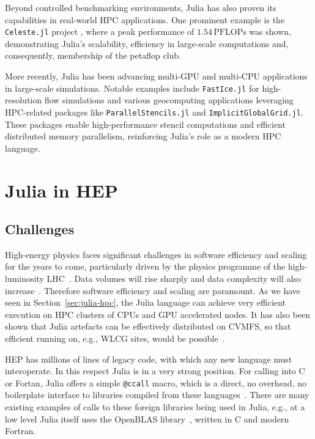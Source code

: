 \documentclass{webofc}
\begin{document}
Beyond controlled benchmarking environments, Julia has also proven its capabilities in real-world HPC applications. One prominent example is the \texttt{Celeste.jl} project \cite{RiegerIEEE:2018,RiegerAAS:2019}, where a peak performance of \(1.54\,\mathrm{PFLOPs}\) was shown, demonstrating Julia's scalability, efficiency in large-scale computations and, consequently, membership of the petaflop club.

More recently, Julia has been advancing multi-GPU and multi-CPU applications in large-scale simulations. Notable examples include \texttt{FastIce.jl}\cite{fasticejl-github} for high-resolution flow simulations and various geocomputing applications leveraging HPC-related packages like \texttt{ParallelStencils.jl}\cite{parallelstenciljl-github} and \texttt{ImplicitGlobalGrid.jl}\cite{implicitglobalgridjl-github}. These packages enable high-performance stencil computations and efficient distributed memory parallelism, reinforcing Julia’s role as a modern HPC language.

\section{Julia in HEP}

\subsection{Challenges}

High-energy physics faces significant challenges in software efficiency and
scaling for the years to come, particularly driven by the physics programme of
the high-luminosity LHC~\cite{hsfcwp}. Data volumes will rise sharply and data
complexity will also
increase~\cite{CERN-LHCC-2022-005,Software:2815292,Valassi2021}. Therefore
software efficiency and scaling are paramount. As we have seen in
Section~\ref{sec:julia-hpc}, the Julia language can achieve very efficient
execution on HPC clusters of CPUs and GPU accelerated nodes. It has also been
shown that Julia artefacts can be effectively distributed on CVMFS, so that efficient
running on, e.g., WLCG sites, would be possible~\cite{elvis_cvmfs_caching}.

HEP has millions
of lines of legacy code, with which
any new language must interoperate. In this respect Julia is in a very strong
position. For calling into C or Fortan, Julia offers a simple \texttt{@ccall}
macro, which is a direct, no overhead, no boilerplate interface to libraries
compiled from these languages~\cite{JuliaManualCCall}. There are many existing
examples of calls to these foreign libraries being used in Julia, e.g., at a low
level Julia itself uses the OpenBLAS library~\cite{6877458}, written in C and
modern Fortran. 
\end{document}
